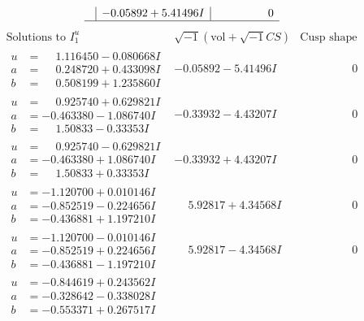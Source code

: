 \documentclass[1p]{elsarticle_modified}
\theoremstyle{definition}
\newcommand{\I}{\sqrt{-1}}
\begin{document}
$$\begin{array}{c|c|c}
 & -0.05892 + 5.41496 I & \phantom{-0.000000 } 0\\
 \hline 
 \end{array}$$\newpage$$\begin{array}{c|c|c}  
\text{Solutions to }I^u_{1}& \I (\text{vol} + \sqrt{-1}CS) & \text{Cusp shape}\\
 \hline 
\begin{aligned}
u &= \phantom{-}1.116450 - 0.080668 I \\
a &= \phantom{-}0.248720 + 0.433098 I \\
b &= \phantom{-}0.508199 + 1.235860 I\end{aligned}
 & -0.05892 - 5.41496 I & \phantom{-0.000000 } 0 \\ \hline\begin{aligned}
u &= \phantom{-}0.925740 + 0.629821 I \\
a &= -0.463380 - 1.086740 I \\
b &= \phantom{-}1.50833 - 0.33353 I\end{aligned}
 & -0.33932 - 4.43207 I & \phantom{-0.000000 } 0 \\ \hline\begin{aligned}
u &= \phantom{-}0.925740 - 0.629821 I \\
a &= -0.463380 + 1.086740 I \\
b &= \phantom{-}1.50833 + 0.33353 I\end{aligned}
 & -0.33932 + 4.43207 I & \phantom{-0.000000 } 0 \\ \hline\begin{aligned}
u &= -1.120700 + 0.010146 I \\
a &= -0.852519 - 0.224656 I \\
b &= -0.436881 + 1.197210 I\end{aligned}
 & \phantom{-}5.92817 + 4.34568 I & \phantom{-0.000000 } 0 \\ \hline\begin{aligned}
u &= -1.120700 - 0.010146 I \\
a &= -0.852519 + 0.224656 I \\
b &= -0.436881 - 1.197210 I\end{aligned}
 & \phantom{-}5.92817 - 4.34568 I & \phantom{-0.000000 } 0 \\ \hline\begin{aligned}
u &= -0.844619 + 0.243562 I \\
a &= -0.328642 - 0.338028 I \\
b &= -0.553371 + 0.267517 I\end{aligned}

\end{array}$$
\end{document}
